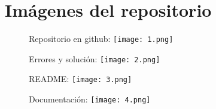 \documentclass[a4paper,11pt]{article}
\theoremstyle{mytheor}
\begin{document}
\section*{Imágenes del repositorio}

\begin{figure}[h]
Repositorio en github:
\texttt{[image: 1.png]}
\centering
\end{figure}

\begin{figure}[h]
Errores y solución:
\texttt{[image: 2.png]}
\centering
\end{figure}

\begin{figure}[h]
README:
\texttt{[image: 3.png]}
\centering
\end{figure}

\begin{figure}[h]
Documentación:
\texttt{[image: 4.png]}
\centering
\end{figure}
\end{document}
